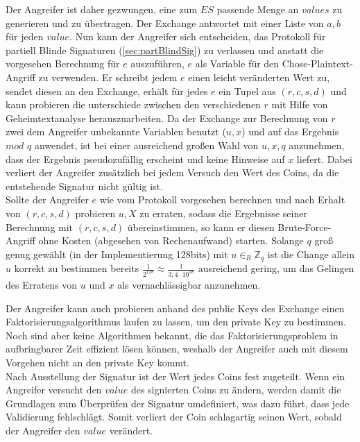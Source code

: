 \documentclass[11pt,a4paper]{scrreprt}
\begin{document}
Der Angreifer ist daher gezwungen, eine zum $ES$ passende Menge an $values$ zu generieren und zu übertragen. Der Exchange antwortet mit einer Liste von $a,b$ für jeden $value$. Nun kann der Angreifer sich entscheiden, das Protokoll für partiell Blinde Signaturen (\ref{sec:partBlindSig}) zu verlassen und anstatt die vorgesehen Berechnung für $e$ auszuführen, $e$ als Variable für den Chose-Plaintext-Angriff zu verwenden. Er schreibt jedem $e$ einen leicht veränderten Wert zu, sendet diesen an den Exchange, erhält für jedes $e$ ein Tupel aus $(r,c,s,d)$ und kann probieren die unterschiede zwischen den verschiedenen $r$ mit Hilfe von Geheimtextanalyse herauszuarbeiten. Da der Exchange zur Berechnung von $r$ zwei dem Angreifer unbekannte Variablen benutzt ($u,x$) und auf das Ergebnis $mod$ $q$ anwendet, ist bei einer ausreichend großen Wahl von $u,x,q$ anzunehmen, dass der Ergebnis pseudozufällig erscheint und keine Hinweise auf $x$ liefert. Dabei verliert der Angreifer zusätzlich bei jedem Versuch den Wert des Coins, da die entstehende Signatur nicht gültig ist.\\

Sollte der Angreifer $e$ wie vom Protokoll vorgesehen berechnen und nach Erhalt von $(r,c,s,d)$ probieren $u,X$ zu erraten, sodass die Ergebnisse seiner Berechnung mit $(r,c,s,d)$ übereinstimmen, so kann er diesen Brute-Force-Angriff ohne Kosten (abgesehen von Rechenaufwand) starten. Solange $q$ groß genug gewählt (in der Implementierung 128bits) mit $u{\in}_{R} {\mathbb{Z}}_{q}$ ist die Change allein $u$ korrekt zu bestimmen bereits $\frac{1}{2^{128}} \approx \frac{1}{3,4\cdot10^{38}}$ ausreichend gering, um das Gelingen des Erratens von $u$ und $x$ als vernachlässigbar anzunehmen.

Der Angreifer kann auch probieren anhand des public Keys des Exchange einen Faktorisierungsalgorithmus laufen zu lassen, um den private Key zu bestimmen. Noch sind aber keine Algorithmen bekannt, die das Faktorisierungsproblem in aufbringbarer Zeit effizient lösen können, weshalb der Angreifer auch mit diesem Vorgehen nicht an den private Key kommt.\\

Nach Ausstellung der Signatur ist der Wert jedes Coins fest zugeteilt. Wenn ein Angreifer versucht den $value$ des signierten Coins zu ändern, werden damit die Grundlagen zum Überprüfen der Signatur umdefiniert, was dazu führt, dass jede Validierung fehlschlägt. Somit verliert der Coin schlagartig seinen Wert, sobald der Angreifer den $value$ verändert.\\
\end{document}

